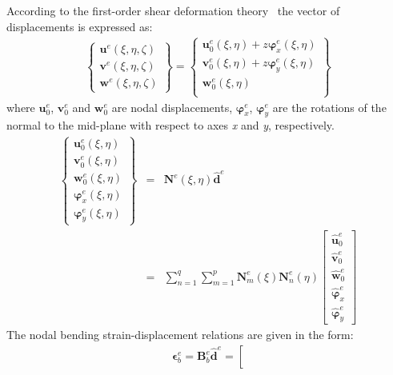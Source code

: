 \documentclass[a4paper,12pt]{article}
\begin{document}
{According to the first-order shear deformation theory~\cite{reissner1945effect, mindlin1951influence} the vector of displacements is expressed as:
\begin{eqnarray}
\left \{ \begin{array}{c}
\textbf{u}^e(\xi,\eta,\zeta) \\
\textbf{v}^e(\xi,\eta,\zeta) \\
\textbf{w}^e(\xi,\eta,\zeta)
\end{array} \right\} = 
\left \{ \begin{array}{c}
\textbf{u}_0^e(\xi,\eta) + z\boldsymbol{\varphi}_x^e(\xi,\eta)\\
\textbf{v}_0^e(\xi,\eta) + z\boldsymbol{\varphi}_y^e(\xi,\eta)\\
\textbf{w}_0^e(\xi,\eta) \\
\end{array} \right\}
\end{eqnarray}
where \(\textbf{u}_0^e\), \(\textbf{v}_0^e\) and \(\textbf{w}_0^e\) are nodal displacements, \(\boldsymbol{\varphi}_x^e\), \(\boldsymbol{\varphi}_y^e\) are the rotations of the normal to the mid-plane with respect to axes \textit{x} and \textit{y}, respectively.
\begin{eqnarray}
\left \{\begin{array}{c}
\textbf{u}_0^e(\xi,\eta) \\
\textbf{v}_0^e(\xi,\eta) \\
\textbf{w}_0^e(\xi,\eta) \\
\boldsymbol{\varphi}_x^e(\xi,\eta) \\
\boldsymbol{\varphi}_y^e(\xi,\eta)
\end{array} \right\}
& = & \textbf{N}^e(\xi,\eta)\widehat{\textbf{d}}^e\nonumber\\
& = & \sum_{n=1}^q\sum_{m=1}^p\textbf{N}_m^e(\xi)\textbf{N}_n^e(\eta)
\left [ \begin{array}{c}
\widehat{\textbf{u}}_0^e \\
\widehat{\textbf{v}}_0^e \\
\widehat{\textbf{w}}_0^e \\
\widehat{\boldsymbol{\varphi}}_x^e \\
\widehat{\boldsymbol{\varphi}}_y^e
\end{array} \right]
\end{eqnarray}
The nodal bending strain-displacement relations are given in the form:
\begin{eqnarray}
\boldsymbol{\epsilon}_b^e =
\textbf{B}_b^e\widehat{\textbf{d}}^e = 
\left [

\end{eqnarray}}
\end{document}
